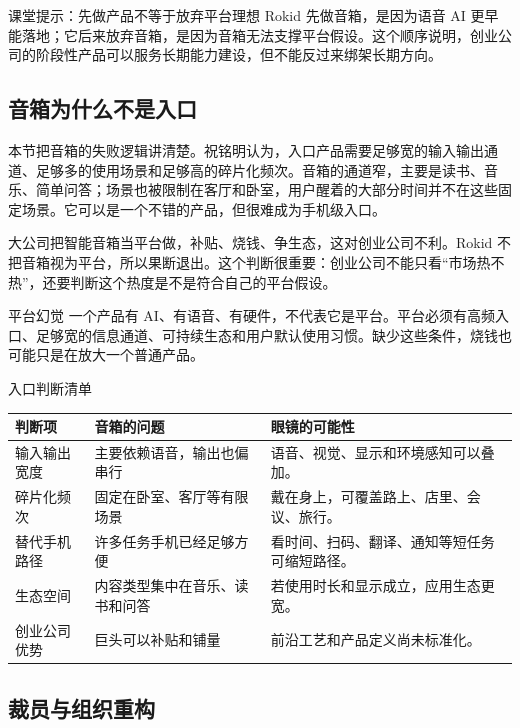 \begin{knowledgebox}{课堂提示：先做产品不等于放弃平台理想}
Rokid 先做音箱，是因为语音 AI 更早能落地；它后来放弃音箱，是因为音箱无法支撑平台假设。这个顺序说明，创业公司的阶段性产品可以服务长期能力建设，但不能反过来绑架长期方向。
\end{knowledgebox}

\subsection{音箱为什么不是入口}

本节把音箱的失败逻辑讲清楚。祝铭明认为，入口产品需要足够宽的输入输出通道、足够多的使用场景和足够高的碎片化频次。音箱的通道窄，主要是读书、音乐、简单问答；场景也被限制在客厅和卧室，用户醒着的大部分时间并不在这些固定场景。它可以是一个不错的产品，但很难成为手机级入口。

大公司把智能音箱当平台做，补贴、烧钱、争生态，这对创业公司不利。Rokid 不把音箱视为平台，所以果断退出。这个判断很重要：创业公司不能只看“市场热不热”，还要判断这个热度是不是符合自己的平台假设。

\begin{warningbox}{平台幻觉}
一个产品有 AI、有语音、有硬件，不代表它是平台。平台必须有高频入口、足够宽的信息通道、可持续生态和用户默认使用习惯。缺少这些条件，烧钱也可能只是在放大一个普通产品。
\end{warningbox}

\begin{knowledgebox}{入口判断清单}
\noindent\begin{tabularx}{\textwidth}{p{}p{}X}
\toprule
判断项 & 音箱的问题 & 眼镜的可能性 \\
\midrule
输入输出宽度 & 主要依赖语音，输出也偏串行 & 语音、视觉、显示和环境感知可以叠加。 \\
碎片化频次 & 固定在卧室、客厅等有限场景 & 戴在身上，可覆盖路上、店里、会议、旅行。 \\
替代手机路径 & 许多任务手机已经足够方便 & 看时间、扫码、翻译、通知等短任务可缩短路径。 \\
生态空间 & 内容类型集中在音乐、读书和问答 & 若使用时长和显示成立，应用生态更宽。 \\
创业公司优势 & 巨头可以补贴和铺量 & 前沿工艺和产品定义尚未标准化。 \\
\bottomrule
\end{tabularx}
\end{knowledgebox}

\subsection{裁员与组织重构}

